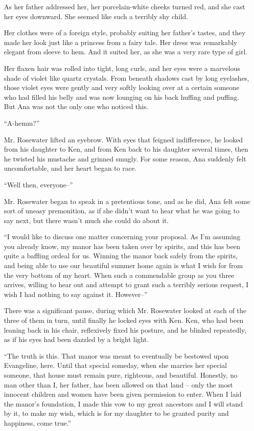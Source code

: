 \documentclass[
]{article}
\begin{document}
As her father addressed her, her porcelain-white cheeks turned red, and
she cast her eyes downward. She seemed like such a terribly shy child.

Her clothes were of a foreign style, probably suiting her father's
tastes, and they made her look just like a princess from a fairy tale.
Her dress was remarkably elegant from sleeve to hem. And it suited her,
as she was a very rare type of girl.

Her flaxen hair was rolled into tight, long curls, and her eyes were a
marvelous shade of violet like quartz crystals. From beneath shadows
cast by long eyelashes, those violet eyes were gently and very softly
looking over at a certain someone who had filled his belly and was now
lounging on his back huffing and puffing. But Ana was not the only one
who noticed this.

``A-hemm?''

Mr. Rosewater lifted an eyebrow. With eyes that feigned indifference, he
looked from his daughter to Ken, and from Ken back to his daughter
several times, then he twisted his mustache and grinned smugly. For some
reason, Ana suddenly felt uncomfortable, and her heart began to race.

``Well then, everyone--''

Mr. Rosewater began to speak in a pretentious tone, and as he did, Ana
felt some sort of uneasy premonition, as if she didn't want to hear what
he was going to say next, but there wasn't much she could do about it.

``I would like to discuss one matter concerning your proposal. As I'm
assuming you already know, my manor has been taken over by spirits, and
this has been quite a baffling ordeal for us. Winning the manor back
safely from the spirits, and being able to use our beautiful summer home
again is what I wish for from the very bottom of my heart. When such a
commendable group as you three arrives, willing to hear out and attempt
to grant such a terribly serious request, I wish I had nothing to say
against it. However--''

There was a significant pause, during which Mr. Rosewater looked at each
of the three of them in turn, until finally he locked eyes with Ken.
Ken, who had been leaning back in his chair, reflexively fixed his
posture, and he blinked repeatedly, as if his eyes had been dazzled by a
bright light.

``The truth is this. That manor was meant to eventually be bestowed upon
Evangeline, here. Until that special someday, when she marries her
special someone, that house must remain pure, righteous, and beautiful.
Honestly, no man other than I, her father, has been allowed on that land
-- only the most innocent children and women have been given permission
to enter. When I laid the manor's foundation, I made this vow to my
great ancestors and I will stand by it, to make my wish, which is for my
daughter to be granted purity and happiness, come true.''
\end{document}
